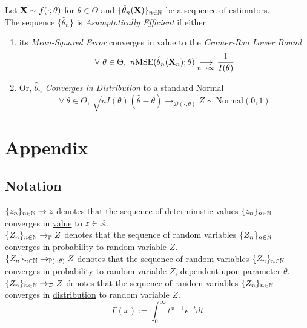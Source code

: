 \documentclass[11pt,a4paper]{article}
\begin{document}
Let $\textbf{X}\sim f(\cdot;\theta)$ for $\theta\in\Theta$ and $\{\hat\theta_n(\textbf{X})\}_{n\in\mathbb{N}}$  be a sequence of estimators.\\
The sequence $\{\hat\theta_n\}$ is \textit{Asumptotically Efficient} if either
\begin{enumerate}
	\item its \textit{Mean-Squared Error} converges in value to the \textit{Cramer-Rao Lower Bound}
	$$\forall\ \theta\in\Theta,\ n\text{MSE}(\hat\theta_n(\X_n);\theta)\underset{n\to\infty}{\longrightarrow}\frac{1}{I(\theta)}$$
	\item Or, $\hat\theta_n$ \textit{Converges in Distribution} to a standard Normal
	$$\forall\ \theta\in\Theta,\ \sqrt{nI(\theta)}(\hat\theta-\theta)\to_{\mathcal{D}(\cdot;\theta)}Z\sim\text{Normal}(0,1)$$
\end{enumerate}




\newpage
\setcounter{section}{-1}
\section{Appendix}

\subsection{Notation}

$\{z_n\}_{n\in\mathbb{N}}\to z$ denotes that the sequence of deterministic values $\{z_n\}_{n\in\mathbb{N}}$ converges in \underline{value} to $z\in\mathbb{R}$.\\
$\{Z_n\}_{n\in\mathbb{N}}\to_{\mathbb{P}} Z$ denotes that the sequence of random variables $\{Z_n\}_{n\in\mathbb{N}}$ converges in \underline{probability} to random variable $Z$.\\
$\{Z_n\}_{n\in\mathbb{N}}\to_{\mathbb{P}(\cdot;\theta)} Z$ denotes that the sequence of random variables $\{Z_n\}_{n\in\mathbb{N}}$ converges in \underline{probability} to random variable $Z$, dependent upon parameter $\theta$.\\
$\{Z_n\}_{n\in\mathbb{N}}\to_\mathcal{D} Z$ denotes that the sequence of random variables $\{Z_n\}_{n\in\mathbb{N}}$ converges in \underline{distribution} to random variable $Z$.\\

$$\Gamma(x):=\int_0^\infty t^{x-1}e^{-t}dt$$
\end{document}

